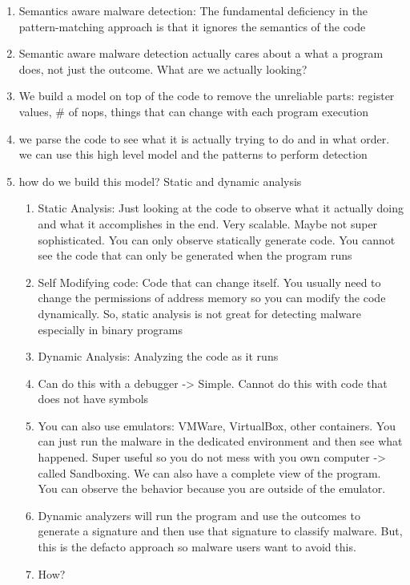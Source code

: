 \documentclass[a4paper, 11pt, oneside]{researchjournal} %
\begin{document}
\begin{enumerate}
     \item Semantics aware malware detection: The fundamental deficiency in the pattern-matching approach is that it ignores the semantics of the code
     \item Semantic aware malware detection actually cares about a what a program does, not just the outcome. What are we actually looking? 
     \item We build a model on top of the code to remove the unreliable parts: register values, \# of nops, things that can change with each program execution
     \item we parse the code to see what it is actually trying to do and in what order. we can use this high level model and the patterns to perform detection
     \item how do we build this model? Static and dynamic analysis
     \begin{enumerate}
         \item Static Analysis: Just looking at the code to observe what it actually doing and what it accomplishes in the end. Very scalable. Maybe not super sophisticated. You can only observe statically generate code. You cannot see the code that can only be generated when the program runs
         \item Self Modifying code: Code that can change itself. You usually need to change the permissions of address memory so you can modify the code dynamically. So, static analysis is not great for detecting malware especially in binary programs
         \item Dynamic Analysis: Analyzing the code as it runs
         \item Can do this with a debugger -> Simple. Cannot do this with code that does not have symbols
         \item You can also use emulators: VMWare, VirtualBox, other containers. You can just run the malware in the dedicated environment and then see what happened. Super useful so you do not mess with you own computer -> called Sandboxing. We can also have a complete view of the program. You can observe the behavior because you are outside of the emulator.
         \item Dynamic analyzers will run the program and use the outcomes to generate a signature and then use that signature to classify malware. But, this is the defacto approach so malware users want to avoid this. 
         \item How?
         \begin{enumerate}

\end{enumerate}
\end{enumerate}
\end{enumerate}
\end{document}
